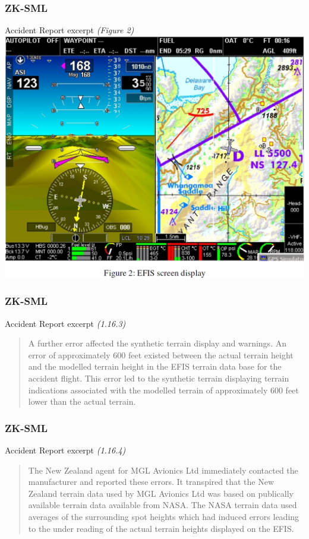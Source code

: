 \begin{frame}
\frametitle{ZK-SML}
\begin{block}{Accident Report excerpt \tiny{\emph{(Figure 2)}}}
\includegraphics[height=0.7\textheight]{image/zk-sml-map.png}
\end{block}
\end{frame}

\begin{frame}
\frametitle{ZK-SML}
\begin{block}{Accident Report excerpt \tiny{\emph{(1.16.3)}}}
\begin{quote}
A further error affected the synthetic terrain display and warnings.  An error of approximately 600 feet existed between the actual terrain height and the modelled terrain height in the EFIS terrain data base for the accident flight.  This error led to the synthetic terrain displaying terrain indications associated with the modelled terrain of approximately 600 feet lower than the actual terrain. 
\end{quote}
\end{block}
\end{frame}

\begin{frame}
\frametitle{ZK-SML}
\begin{block}{Accident Report excerpt \tiny{\emph{(1.16.4)}}}
\begin{quote}
The New Zealand agent for MGL Avionics Ltd immediately contacted the manufacturer and reported these errors.  It transpired that the New Zealand terrain data used by MGL Avionics Ltd was based on publically available terrain data available from NASA.  The NASA terrain data used averages of the surrounding spot heights which had induced errors leading to the under reading of the actual terrain heights displayed on the EFIS. 
\end{quote}
\end{block}
\end{frame}

